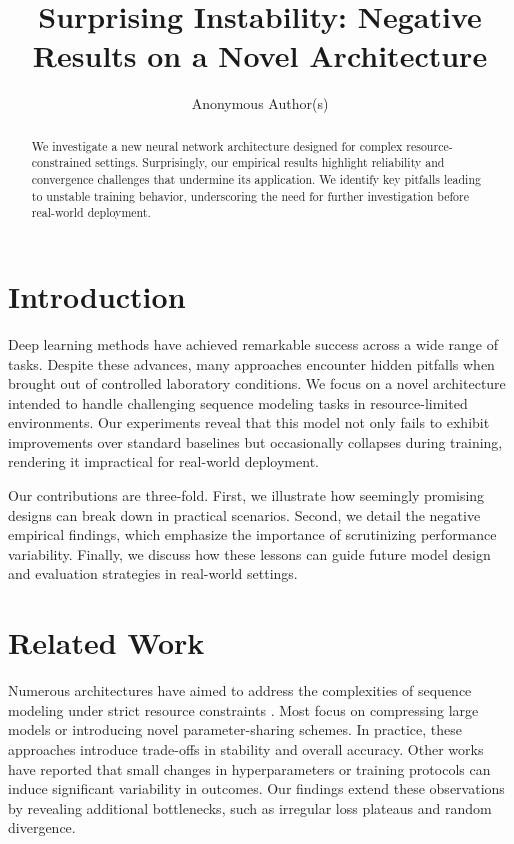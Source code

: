 \documentclass{article}
\title{Surprising Instability: Negative Results on a Novel Architecture}
\author{
  Anonymous Author(s)
}
\begin{document}
\maketitle

\begin{abstract}
We investigate a new neural network architecture designed for complex resource-constrained settings. Surprisingly, our empirical results highlight reliability and convergence challenges that undermine its application. We identify key pitfalls leading to unstable training behavior, underscoring the need for further investigation before real-world deployment.
\end{abstract}

\section{Introduction}
Deep learning methods have achieved remarkable success across a wide range of tasks. Despite these advances, many approaches encounter hidden pitfalls when brought out of controlled laboratory conditions. We focus on a novel architecture intended to handle challenging sequence modeling tasks in resource-limited environments. Our experiments reveal that this model not only fails to exhibit improvements over standard baselines but occasionally collapses during training, rendering it impractical for real-world deployment.

Our contributions are three-fold. First, we illustrate how seemingly promising designs can break down in practical scenarios. Second, we detail the negative empirical findings, which emphasize the importance of scrutinizing performance variability. Finally, we discuss how these lessons can guide future model design and evaluation strategies in real-world settings.

\section{Related Work}
Numerous architectures have aimed to address the complexities of sequence modeling under strict resource constraints \citep{placeholder2025}. Most focus on compressing large models or introducing novel parameter-sharing schemes. In practice, these approaches introduce trade-offs in stability and overall accuracy. Other works have reported that small changes in hyperparameters or training protocols can induce significant variability in outcomes. Our findings extend these observations by revealing additional bottlenecks, such as irregular loss plateaus and random divergence.
\end{document}
